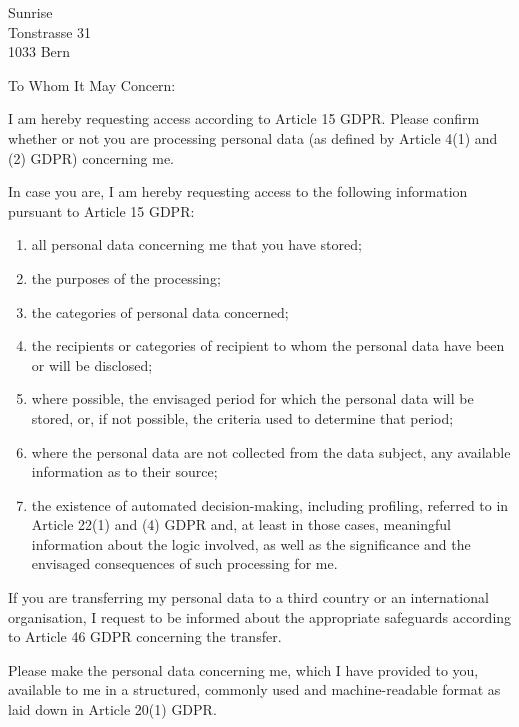 \documentclass[11pt, a4paper]{letter} %
\begin{document}

\begin{letter}{
	Sunrise\\
	Tonstrasse 31 \\
    1033 Bern
}


\opening{To Whom It May Concern:}

I am hereby requesting access according to Article 15 GDPR. Please confirm whether or not you are processing personal data (as defined by Article 4(1) and (2) GDPR) concerning me.

In case you are, I am hereby requesting access to the following information pursuant to Article 15 GDPR:
\begin{enumerate}
\itemsep0em 
\item all personal data concerning me that you have stored;
\item the purposes of the processing;
\item the categories of personal data concerned;
\item the recipients or categories of recipient to whom the personal data have been or will be disclosed;
\item where possible, the envisaged period for which the personal data will be stored, or, if not possible, the criteria used to determine that period;
\item where the personal data are not collected from the data subject, any available information as to their source;
\item the existence of automated decision-making, including profiling, referred to in Article 22(1) and (4) GDPR and, at least in those cases, meaningful information about the logic involved, as well as the significance and the envisaged consequences of such processing for me.
\end{enumerate}

If you are transferring my personal data to a third country or an international organisation, I request to be informed about the appropriate safeguards according to Article 46 GDPR concerning the transfer.

Please make the personal data concerning me, which I have provided to you, available to me in a structured, commonly used and machine-readable format as laid down in Article 20(1) GDPR.


\end{letter}
\end{document}
